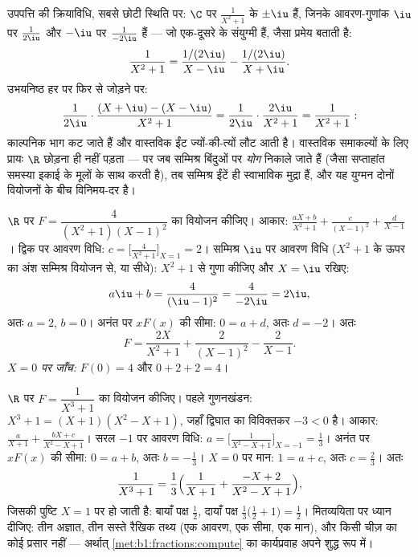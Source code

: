 \begin{example}[संयुग्मी युग्मन को देखना]\label{ex:b1:fractions:pairing}
उपपत्ति की क्रियाविधि, सबसे छोटी स्थिति पर: $\C$ पर $\frac1{X^2+1}$ के 
$\pm\iu$ हैं, जिनके आवरण-गुणांक $\iu$ पर $\frac1{2\iu}$ और $-\iu$ पर
$\frac1{-2\iu}$ हैं --- जो एक-दूसरे के संयुग्मी हैं, जैसा प्रमेय बताती है:
\[
\frac{1}{X^2 + 1}
= \frac{1/(2\iu)}{X - \iu} - \frac{1/(2\iu)}{X + \iu} .
\]
उभयनिष्ठ हर पर फिर से जोड़ने पर:
\[
\frac{1}{2\iu}\cdot\frac{(X + \iu) - (X - \iu)}{X^2 + 1}
= \frac{1}{2\iu}\cdot\frac{2\iu}{X^2 + 1} = \frac{1}{X^2+1} :
\]
काल्पनिक भाग कट जाते हैं और वास्तविक ईंट ज्यों-की-त्यों लौट आती है। वास्तविक
समाकल्यों के लिए प्रायः $\R$ छोड़ना ही नहीं पड़ता --- पर जब सम्मिश्र बिंदुओं
पर \emph{योग} निकाले जाते हैं (जैसा सप्ताहांत समस्या इकाई के मूलों के साथ
करती है), तब सम्मिश्र ईंटें ही स्वाभाविक मुद्रा हैं, और यह युग्मन दोनों
वियोजनों के बीच विनिमय-दर है।
\end{example}

\begin{example}\label{ex:b1:fractions:real}
$\R$ पर $F = \dfrac{4}{(X^2+1)(X-1)^2}$ का वियोजन कीजिए। आकार: $\frac{aX +
b}{X^2 + 1} + \frac{c}{(X-1)^2} + \frac{d}{X - 1}$। द्विक  पर आवरण
विधि: $c = \bigl[\frac{4}{X^2+1}\bigr]_{X=1} = 2$। सम्मिश्र  $\iu$ पर
आवरण विधि ($X^2 + 1$ के ऊपर का अंश सम्मिश्र वियोजन से, या सीधे): $X^2 + 1$
से गुणा कीजिए और $X = \iu$ रखिए:
\[
a\iu + b = \frac{4}{(\iu - 1)^2} = \frac{4}{-2\iu} = 2\iu ,
\]
अतः $a = 2$, $b = 0$। अनंत पर $xF(x)$ की सीमा: $0 = a + d$, अतः $d = -2$।
अतः
\[
F = \frac{2X}{X^2+1} + \frac{2}{(X-1)^2} - \frac{2}{X-1} .
\]
\emph{$X = 0$ पर जाँच:} $F(0) = 4$ और $0 + 2 + 2 = 4$।
\end{example}

\begin{example}[त्रिघात हर, आरंभ से अंत तक]\label{ex:b1:fractions:cubic}
$\R$ पर $F = \dfrac{1}{X^3 + 1}$ का वियोजन कीजिए। पहले गुणनखंडन: $X^3 + 1 =
(X + 1)(X^2 - X + 1)$, जहाँ द्विघात का विविक्तकर $-3 < 0$ है। आकार:
$\frac{a}{X+1} + \frac{bX + c}{X^2 - X + 1}$। सरल  $-1$ पर आवरण विधि:
$a = \bigl[\frac1{X^2 - X + 1}\bigr]_{X=-1} = \frac13$। अनंत पर $xF(x)$ की
सीमा: $0 = a + b$, अतः $b = -\frac13$। $X = 0$ पर मान: $1 = a + c$, अतः $c =
\frac23$। अतः
\[
\frac{1}{X^3+1} = \frac13\Bigl(\frac{1}{X+1}
+ \frac{-X + 2}{X^2 - X + 1}\Bigr) ,
\]
जिसकी पुष्टि $X = 1$ पर हो जाती है: बायाँ पक्ष $\frac12$, दायाँ पक्ष
$\frac13\bigl(\frac12 + 1\bigr) = \frac12$। मितव्ययिता पर ध्यान दीजिए: तीन
अज्ञात, तीन सस्ते रैखिक तथ्य (एक आवरण, एक सीमा, एक मान), और किसी चीज़ का कोई
प्रसार नहीं --- अर्थात् \cref{met:b1:fractions:compute} का कार्यप्रवाह अपने
शुद्ध रूप में।
\end{example}

